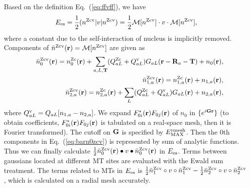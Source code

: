 \documentclass[twocolumn,showpacs,preprintnumbers,amsmath,amssymb,floatfix]{revtex4-1}
\newcommand{\bfr}{{\bf r}}
\newcommand{\bfT}{{\bf T}}
\newcommand{\bfG}{{\bf G}}
\newcommand{\bfR}{{\bf R}}
\newcommand{\req}[1]{\mbox{Eq.~\!(\ref{#1})}}
\def\EMAXm{ E^{\rm rmesh}_{\rm MAX} }
\def\EMAXm{ E^{\rm rmesh}_{\rm MAX} }
\def\nc{n^{\rm c}}
\def\nzc{n^{\rm Zc}}
\def\nzcv{n^{\rm Zcv}}
\def\barnzcv{\bar{n}^{\rm Zcv}}
\def\MM{{\cal M}}
\def\RR{w}
\def\rhoij{\rho_{ij}}
\def\EMAXm{ E^{\rm rmesh}_{\rm MAX} }
\def\EMAXm{ E^{\rm rmesh}_{\rm MAX} }
\def\nc{n^{\rm c}}
\def\nzc{n^{\rm Zc}}
\def\nzcv{n^{\rm Zcv}}
\def\barnzcv{\bar{n}^{\rm Zcv}}
\def\MM{{\cal M}}
\def\RR{v}
\def\rhoij{\rho_{ij}}
\begin{document}
\begin{widetext}
Based on the definition \req{eq:ffvff}, we have
\begin{eqnarray}
E_{\rm es}= \frac{1}{2} (\nzcv|v|\nzcv)=\frac{1}{2} \MM[\nzcv] \cdot v \cdot \MM[\nzcv],
\label{eq:es}
\end{eqnarray}
where a constant due to the self-interaction of nucleus is implicitly
removed. 
Components of $\barnzcv(\bfr)=\MM[\nzcv]$ are given as
\begin{eqnarray}
&&\barnzcv_0(\bfr)= \nzc_{0}(\bfr)
+ \sum_{a,L,\bfT} 
(Q_{aL}^{\rm Zc}+Q^{\rm v}_{aL})G_{aL}(\bfr-\bfR_a-\bfT)+ n_0(\bfr),
\label{eq:barn0zcv}\\
&&\barnzcv_{1,a}(\bfr)=\nzc_{1,a}(\bfr) +n_{1,a}(\bfr), \label{eq:barn1zcv}\\
&&\barnzcv_{2,a}(\bfr)=\nzc_{2,a}(\bfr) 
+\sum_L (Q_{aL}^{\rm Zc}+Q^{\rm v}_{aL})G_{aL}(\bfr)+n_{2,a}(\bfr),\label{eq:barn2zcv}
\end{eqnarray}
where $Q^{\rm v}_{aL}=Q_{aL}[n_{1,a}-n_{2,a}]$.  We expand
$F^*_{0i}(\bfr)F_{0j}(\bfr)$ of $n_0$ in $\{e^{i \bfG \bfr}\}$ (to
obtain coefficients, $F^*_{0i}(\bfr)F_{0j}(\bfr)$ is tabulated on a
real-space mesh, then it is Fourier transformed).  The cutoff on $\bfG$
is specified by $\EMAXm$.  Then the 0th components in \req{eq:barn0zcv}
is represented by sum of analytic functions. Thus we can finally
calculate $\frac{1}{2} \barnzcv_0(\bfr) \bullet v \bullet
\barnzcv_0(\bfr)$ in $E_{\rm es}$.  Terms between gaussians located at
different MT sites are evaluated with the Ewald sum treatment.  The
terms related to MTs in $E_{\rm es}$ is $ \frac{1}{2} \barnzcv_1 \circ
\RR \circ \barnzcv_1 - \frac{1}{2} \barnzcv_2 \circ \RR \circ
\barnzcv_2$, which is calculated on a radial mesh accurately.


\end{widetext}
\end{document}
